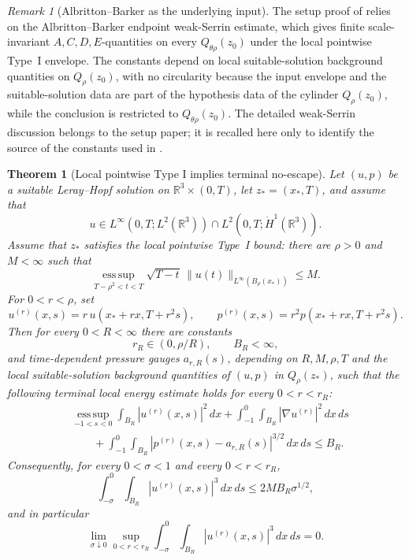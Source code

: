 \documentclass[11pt]{amsart}
\numberwithin{equation}{section}
\theoremstyle{plain}
\newtheorem{theorem}{Theorem}[section]
\theoremstyle{definition}
\theoremstyle{remark}
\newtheorem{remark}[remark]{Remark}
\newcommand{\esssup}{\operatorname*{ess\,sup}}
\begin{document}
\begin{remark}[Albritton--Barker as the underlying input]
\label{rem:AB-underlying-input}
The setup proof of
 relies on the Albritton--Barker
endpoint weak-Serrin estimate, which gives finite scale-invariant
\(A,C,D,E\)-quantities on every \(Q_{\theta\rho}(z_0)\) under the local
pointwise Type~I envelope.  The constants depend on local suitable-solution
background quantities on \(Q_\rho(z_0)\), with no circularity because the
input envelope and the suitable-solution data are part of the hypothesis
data of the cylinder \(Q_\rho(z_0)\), while the conclusion is restricted to
\(Q_{\theta\rho}(z_0)\).  The detailed weak-Serrin discussion belongs to the
setup paper; it is recalled here only to identify the source of the constants
used in .
\end{remark}

\begin{theorem}[Local pointwise Type I implies terminal no-escape]
\label{thm:local-typeI-terminal-energy-estimates}
Let \((u,p)\) be a suitable Leray--Hopf solution on
\(\mathbb R^3\times(0,T)\), let \(z_*=(x_*,T)\), and assume that
\[
  u\in L^\infty(0,T;L^2(\mathbb R^3))
  \cap L^2(0,T;\dot H^1(\mathbb R^3)).
\]
Assume that \(z_*\) satisfies the local pointwise Type~I bound: there are
\(\rho>0\) and \(M<\infty\) such that
\begin{equation}\label{eq:local-typeI-terminal-noescape-assumption}
  \esssup_{T-\rho^2<t<T}
  \sqrt{T-t}\,\|u(t)\|_{L^\infty(B_\rho(x_*))}
  \le M .
\end{equation}
For \(0<r<\rho\), set
\[
  u^{(r)}(x,s)
  =
  r\,u(x_*+rx,T+r^2s),
  \qquad
  p^{(r)}(x,s)
  =
  r^2p(x_*+rx,T+r^2s).
\]
Then for every \(0<R<\infty\) there are constants
\[
  r_R\in(0,\rho/R),\qquad B_R<\infty,
\]
and time-dependent pressure gauges \(a_{r,R}(s)\), depending on
\(R,M,\rho,T\) and the local suitable-solution background quantities of
\((u,p)\) in \(Q_\rho(z_*)\), such that the following terminal local energy
estimate holds for every \(0<r<r_R\):
\begin{equation}\label{eq:local-terminal-energy-estimates}
\begin{aligned}
  &\esssup_{-1<s<0}\int_{B_R}|u^{(r)}(x,s)|^2\,dx
  +\int_{-1}^{0}\int_{B_R}|\nabla u^{(r)}|^2\,dx\,ds  \\
  &\qquad
  +\int_{-1}^{0}\int_{B_R}
      |p^{(r)}(x,s)-a_{r,R}(s)|^{3/2}\,dx\,ds
  \le B_R .
\end{aligned}
\end{equation}
Consequently, for every \(0<\sigma<1\) and every \(0<r<r_R\),
\begin{equation}\label{eq:local-terminal-noescape-bound}
  \int_{-\sigma}^{0}\int_{B_R}|u^{(r)}(x,s)|^3\,dx\,ds
  \le
  2MB_R\sigma^{1/2},
\end{equation}
and in particular
\begin{equation}\label{eq:local-terminal-noescape}
  \lim_{\sigma\downarrow0}
  \sup_{0<r<r_R}
  \int_{-\sigma}^{0}\int_{B_R}|u^{(r)}(x,s)|^3\,dx\,ds
  =0 .
\end{equation}
\end{theorem}
\end{document}
